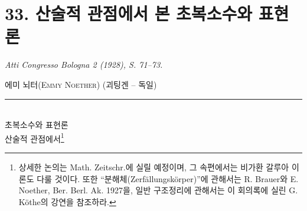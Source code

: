 \documentclass[11pt]{article}
\begin{document}
\section*{33. 산술적 관점에서 본 초복소수와 표현론}
\emph{Atti Congresso Bologna 2 (1928), S. 71--73.}

\renewcommand{\thefootnote}{(\arabic{footnote})}

\begin{center}
\textsc{에미 뇌터(Emmy Noether)} (괴팅겐 -- 독일)\\[-0.1em]
\rule{3em}{0.4pt}\\[0.8em]
\textsc{초복소수와 표현론}\\
\textsc{산술적 관점에서}\footnote{상세한 논의는 Math. Zeitschr.에 실릴 예정이며, 그 속편에서는 비가환 갈루아 이론도 다룰 것이다. 또한 ``분해체(Zerfällungskörper)''에 관해서는 R. Brauer와 E. Noether, Ber. Berl. Ak. 1927을, 일반 구조정리에 관해서는 이 회의록에 실린 G. Köthe의 강연을 참조하라.}
\end{center}
\end{document}
